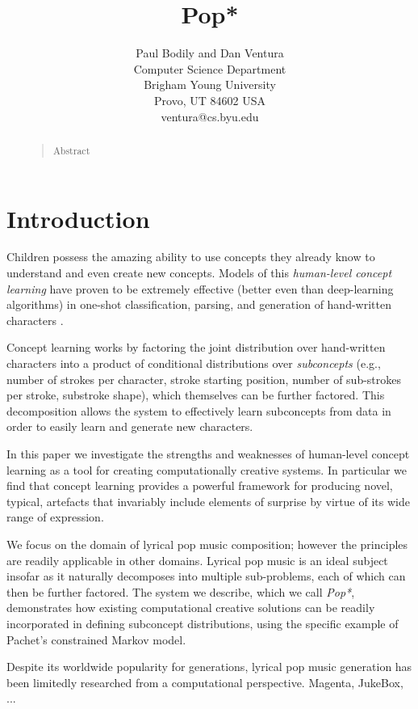 \documentclass[letterpaper]{article}
\title{Pop*}
\author{Paul Bodily and Dan Ventura\\
Computer Science Department\\
Brigham Young University\\
Provo, UT 84602  USA\\
ventura@cs.byu.edu\\
}
\begin{document}
 
\maketitle
\begin{abstract}
\begin{quote}
Abstract
\end{quote}
\end{abstract}

\section{Introduction}

Children possess the amazing ability to use concepts they already know to understand and even create new concepts. Models of this \textit{human-level concept learning} have proven to be extremely effective (better even than deep-learning algorithms) in one-shot classification, parsing, and generation of hand-written characters \cite{lake2015human}.

Concept learning works by factoring the joint distribution over hand-written characters into a product of conditional distributions over \textit{subconcepts} (e.g., number of strokes per character, stroke starting position, number of sub-strokes per stroke, substroke shape), which themselves can be further factored. This decomposition allows the system to effectively learn subconcepts from data in order to easily learn and generate new characters.

In this paper we investigate the strengths and weaknesses of human-level concept learning as a tool for creating computationally creative systems. In particular we find that concept learning provides a powerful framework for producing novel, typical, artefacts that invariably include elements of surprise by virtue of its wide range of expression.

We focus on the domain of lyrical pop music composition; however the principles are readily applicable in other domains. Lyrical pop music is an ideal subject insofar as it naturally decomposes into multiple sub-problems, each of which can then be further factored. The system we describe, which we call \textit{Pop*}, demonstrates how existing computational creative solutions can be readily incorporated in defining subconcept distributions, using the specific example of Pachet's constrained Markov model.

Despite its worldwide popularity for generations, lyrical pop music generation has been limitedly researched from a computational perspective. Magenta, JukeBox, ...
\end{document}
